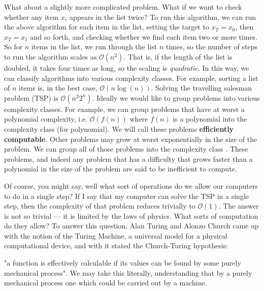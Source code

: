 What about a slightly more complicated problem. What if we want to check whether any item $x_i$ appears
in the list twice? To run this algorithm, we can run the above algorithm for each item in the list, setting the
target to $x_T = x_0$, then $x_T = x_1$ and so forth, and checking whether we find each item two or more
times. So for $n$ items in the list, we run through the list $n$ times, so the number of steps to run
the algorithm scales as $\mathcal{O}(n^2)$. That is, if the length of the list is doubled, it takes
four times as long, so the scaling is \emph{quadratic}.
In this way, we can classify algorithms into various complexity classes. For example, sorting a list
of $n$ items is, in the best case, $\mathcal{O}(n \log(n))$. Solving the travelling salesman problem (TSP) is
$\mathcal{O}(n^2 2^n)$. Ideally we would like to group problems into various complexity classes. For example,
we can group problems that have at worst a polynomial complexity, i.e. $\mathcal{O}\left(f(n)\right)$ where $f(n)$
is a polynomial into the complexity class  (for polynomial). We will call these problems \textbf{efficiently
computable}. Other problems may grow at worst exponentially in the size of the problem. We can group all
of those problems into the complexity class . These problems, and indeed any problem that has a difficulty
that grows faster than a polynomial in the size of the problem are said to be inefficient to compute.

Of course, you might say, well what sort of operations do we allow our computers to do in a single step?
If I say that my computer can solve the TSP in a single step, then the complexity of that problem reduces trivially to
$\mathcal{O}(1)$. The answer is not so trivial --- it is limited by the laws of physics. What sorts
of computation do they allow? To answer this question, Alan Turing and Alonzo Church came up with the notion of
the Turing Machine, a universal model for a physical computational device, and with it stated the Church-Turing
hypothesis:

\begin{displayquote}
  "a function is effectively calculable if its values can be found by some purely mechanical process".
  We may take this literally, understanding that by a purely mechanical process one which could be carried out by a machine.
\end{displayquote}

